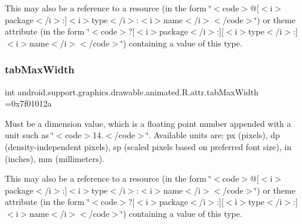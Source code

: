 This may also be a reference to a resource (in the form \char`\"{}$<$code$>$@\mbox{[}$<$i$>$package$<$/i$>$\+:\mbox{]}$<$i$>$type$<$/i$>$\+:$<$i$>$name$<$/i$>$$<$/code$>$\char`\"{}) or theme attribute (in the form \char`\"{}$<$code$>$?\mbox{[}$<$i$>$package$<$/i$>$\+:\mbox{]}\mbox{[}$<$i$>$type$<$/i$>$\+:\mbox{]}$<$i$>$name$<$/i$>$$<$/code$>$\char`\"{}) containing a value of this type. \mbox{\label{classandroid_1_1support_1_1graphics_1_1drawable_1_1animated_1_1R_1_1attr_a67c2a366d76ca3e0a9a554c85609cc92}} 
\subsubsection{\texorpdfstring{tab\+Max\+Width}{tabMaxWidth}}
{\footnotesize\ttfamily int android.\+support.\+graphics.\+drawable.\+animated.\+R.\+attr.\+tab\+Max\+Width =0x7f01012a\hspace{0.3cm}{\ttfamily [static]}}

Must be a dimension value, which is a floating point number appended with a unit such as \char`\"{}$<$code$>$14.\+5sp$<$/code$>$\char`\"{}. Available units are\+: px (pixels), dp (density-\/independent pixels), sp (scaled pixels based on preferred font size), in (inches), mm (millimeters). 

This may also be a reference to a resource (in the form \char`\"{}$<$code$>$@\mbox{[}$<$i$>$package$<$/i$>$\+:\mbox{]}$<$i$>$type$<$/i$>$\+:$<$i$>$name$<$/i$>$$<$/code$>$\char`\"{}) or theme attribute (in the form \char`\"{}$<$code$>$?\mbox{[}$<$i$>$package$<$/i$>$\+:\mbox{]}\mbox{[}$<$i$>$type$<$/i$>$\+:\mbox{]}$<$i$>$name$<$/i$>$$<$/code$>$\char`\"{}) containing a value of this type. \mbox{\label{classandroid_1_1support_1_1graphics_1_1drawable_1_1animated_1_1R_1_1attr_a509554fc1d6c0663e67259ff8aed2b8b}} 
